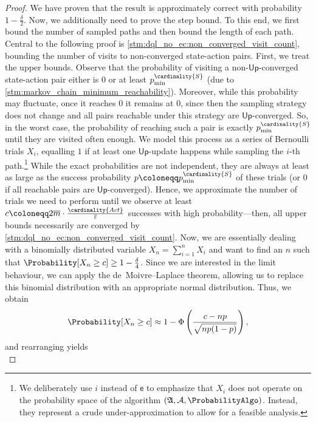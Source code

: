 \documentclass{theoretics}
\newcommand{\States}{S}
\newcommand{\Actions}{Act}
\newcommand{\upperbound}{\mathsf{Up}}
\newcommand{\updatestep}{{\overline{\varepsilon}}}
\newcommand{\delay}{{\overline{m}}}
\newcommand{\algoepisode}{\mathsf{e}}
\newcommand{\algorithmspace}{\mathfrak{A}}
\newcommand{\algorithmsigma}{\mathcal{A}}
\begin{document}
\begin{proof}
	We have proven that the result is approximately correct with probability $1 - \frac{\delta}{2}$.
	Now, we additionally need to prove the step bound.
	To this end, we first bound the number of sampled paths and then bound the length of each path.
	Central to the following proof is \cref{stm:dql_no_ec:non_converged_visit_count}, bounding the number of visits to non-converged state-action pairs.
	First, we treat the upper bounds.
	Observe that the probability of visiting a non-$\upperbound$-converged state-action pair either is $0$ or at least $p_{\min}^{\cardinality{\States}}$ (due to \cref{stm:markov_chain_minimum_reachability}).
	Moreover, while this probability may fluctuate, once it reaches $0$ it remains at $0$, since then the sampling strategy does not change and all pairs reachable under this strategy are $\upperbound$-converged.
	So, in the worst case, the probability of reaching such a pair is exactly $p_{\min}^{\cardinality{\States}}$ until they are visited often enough.
	We model this process as a series of Bernoulli trials $X_i$, equalling $1$ if at least one $\upperbound$-update happens while sampling the $i$-th path.\footnote{We deliberately use $i$ instead of $\algoepisode$ to emphasize that $X_i$ does not operate on the probability space of the algorithm $(\algorithmspace, \algorithmsigma, \ProbabilityAlgo)$.
	Instead, they represent a crude under-approximation to allow for a feasible analysis.}
	While the exact probabilities are not independent, they are always at least as large as the success probability $p \coloneqq p_{\min}^{\cardinality{\States}}$ of these trials (or $0$ if all reachable pairs are $\upperbound$-converged).
	Hence, we approximate the number of trials we need to perform until we observe at least $c \coloneqq 2 \delay \cdot \frac{\cardinality{\Actions}}{\updatestep}$ successes with high probability---then, all upper bounds necessarily are converged by \cref{stm:dql_no_ec:non_converged_visit_count}.
	Now, we are essentially dealing with a binomially distributed variable $X_n = \sum_{i=1}^n X_i$ and want to find an $n$ such that $\Probability[X_n \geq c] \geq 1 - \frac{\delta}{4}$.
	Since we are interested in the limit behaviour, we can apply the de~Moivre--Laplace theorem, allowing us to replace this binomial distribution with an appropriate normal distribution.
	Thus, we obtain
	\begin{equation*}
		\Probability[X_n \geq c] \approx 1 - \Phi \left( \frac{c - np}{\sqrt{np(1-p)}} \right),
	\end{equation*}
	and rearranging yields
	\begin{equation*}

\end{equation*}
\end{proof}
\end{document}
